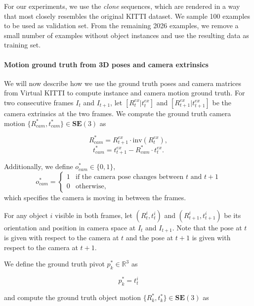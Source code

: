 For our experiments, we use the \emph{clone} sequences, which are rendered in a
way that most closely resembles the original KITTI dataset. We sample 100 examples
to be used as validation set. From the remaining 2026 examples,
we remove a small number of examples without object instances and use the resulting
data as training set.

\paragraph{Motion ground truth from 3D poses and camera extrinsics}
We will now describe how we use the ground truth poses and camera matrices from Virtual KITTI to
compute instance and camera motion ground truth.
For two consecutive frames $I_t$ and $I_{t+1}$,
let $[R_t^{ex}|t_t^{ex}]$
and $[R_{t+1}^{ex}|t_{t+1}^{ex}]$
be the camera extrinsics at the two frames.
We compute the ground truth camera motion
$\{R_{cam}^*, t_{cam}^*\} \in \mathbf{SE}(3)$ as

\begin{equation}
R_{cam}^* = R_{t+1}^{ex}  \cdot \mathrm{inv}(R_t^{ex}),
\end{equation}
\begin{equation}
t_{cam}^* = t_{t+1}^{ex}  - R_{cam}^* \cdot t_t^{ex}.
\end{equation}

Additionally, we define $o_{cam}^* \in \{ 0, 1 \}$,
\begin{equation}
o_{cam}^* =
\begin{cases}
1 &\text{if the camera pose changes between $t$ and $t+1$} \\
0 &\text{otherwise,}
\end{cases}
\end{equation}
which specifies the camera is moving in between the frames.

For any object $i$ visible in both frames, let
$(R_t^i, t_t^i)$ and $(R_{t+1}^i, t_{t+1}^i)$
be its orientation and position in camera space
at $I_t$ and $I_{t+1}$.
Note that the pose at $t$ is given with respect to the camera at $t$ and
the pose at $t+1$ is given with respect to the camera at $t+1$.

We define the ground truth pivot $p_k^* \in \mathbb{R}^3$ as

\begin{equation}
p_k^* = t_t^i
\end{equation}

and compute the ground truth object motion
$\{R_k^*, t_k^*\} \in \mathbf{SE}(3)$ as

